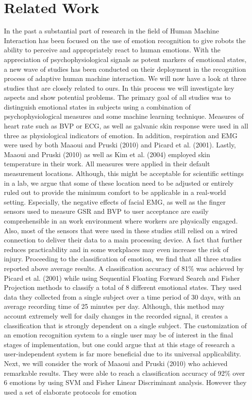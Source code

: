 
\section{Related Work}
In the past a substantial part of research in the field of Human Machine Interaction has been focused on the use of emotion recognition to give robots the ability to perceive and appropriately react to human emotions. With the appreciation of psychophysiological signals as potent markers of emotional states, a new wave of studies has been conducted on their deployment in the recognition process of adaptive human machine interaction.
We will now have a look at three studies that are closely related to ours. In this process we will investigate key aspects and show potential problems. The primary goal of all studies was to distinguish emotional states in subjects using a combination of psychophysiological measures and some machine learning technique. Measures of heart rate such as BVP or ECG, as well as galvanic skin response were used in all three as physiological indicators of emotion. In addition, respiration and EMG were used by both Maaoui and Pruski (2010) and Picard et al. (2001). Lastly, Maaoui and Pruski (2010) as well as Kim et al. (2004) employed skin temperature in their work. All measures were applied in their default measurement locations. Although, this might be acceptable for scientific settings in a lab, we argue that some of these location need to be adjusted or entirely ruled out to provide the minimum comfort to be applicable in a real-world setting. Especially, the negative effects of facial EMG, as well as the finger sensors used to measure GSR and BVP to user acceptance are easily comprehensible in an work environment where workers are physically engaged. Also, most of the sensors that were used in these studies still relied on a wired connection to deliver their data to a main processing device. A fact that further reduces practicability and in some workplaces may even increase the risk of injury.
Proceeding to the classification of emotion, we find that all three studies reported above average results. A classification accuracy of 81\% was achieved by Picard et al. (2001) while using Sequential Floating Forward Search and Fisher Projection methods to classify a total of 8 different emotional states. They used data they collected from a single subject over a time period of 30 days, with an average recording time of 25 minutes per day. Although, this method may account extremely well for daily changes in the recorded signal, it creates a  classification that is strongly dependent on a single subject. The customization of an emotion recognition system to a single user may be of interest in the final stages of implementation, but one could argue that at this stage of research a user-independent system is far more beneficial due to its universal applicability. Next, we will consider the work of Maaoui and Pruski (2010) who achieved remarkable results. They were able to reach a classification accuracy of 92\% over 6 emotions by using SVM and Fisher Linear Discriminant analysis. However they used a set of elaborate protocols for emotion
